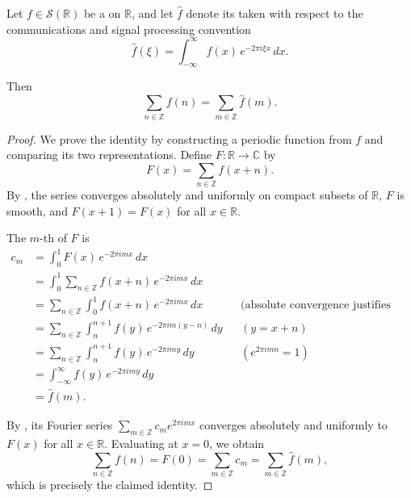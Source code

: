 \begin{theorem}
\label{theorem:poisson_summation_formula_for_schwartz_functions_on_real_numbers}
Let $f \in \mathcal{S}(\mathbb{R})$ be a  on $\mathbb{R}$, and let $\hat{f}$ denote its  taken with respect to the communications and signal processing convention
$$\hat{f}(\xi) = \int_{-\infty}^{\infty} f(x) \, e^{-2\pi i \xi x} \, dx.$$

Then
$$\sum_{n \in \mathbb{Z}} f(n) = \sum_{m \in \mathbb{Z}} \hat{f}(m).$$
\end{theorem}

\begin{proof}
We prove the identity by constructing a periodic function from $f$ and comparing its two representations.
Define $F : \mathbb{R} \to \mathbb{C}$ by
$$F(x) = \sum_{n \in \mathbb{Z}} f(x + n).$$
By , the series converges absolutely and uniformly on compact subsets of $\mathbb{R}$, $F$ is smooth, and $F(x+1) = F(x)$ for all $x \in \mathbb{R}$.

The $m$-th  of $F$ is
\begin{align*}
c_m &= \int_0^1 F(x) \, e^{-2\pi i m x} \, dx \\
    &= \int_0^1 \sum_{n \in \mathbb{Z}} f(x + n) \, e^{-2\pi i m x} \, dx \\
    &= \sum_{n \in \mathbb{Z}} \int_0^1 f(x + n) \, e^{-2\pi i m x} \, dx &&\text{(absolute convergence justifies interchange)} \\
    &= \sum_{n \in \mathbb{Z}} \int_n^{n+1} f(y) \, e^{-2\pi i m (y - n)} \, dy &&(y = x + n) \\
    &= \sum_{n \in \mathbb{Z}} \int_n^{n+1} f(y) \, e^{-2\pi i m y} \, dy &&(e^{2\pi i m n} = 1) \\
    &= \int_{-\infty}^{\infty} f(y) \, e^{-2\pi i m y} \, dy \\
    &= \hat{f}(m). 
\end{align*}

By , its Fourier series $\sum_{m\in\mathbb{Z}} c_m e^{2\pi i m x}$ converges absolutely and uniformly to $F(x)$ for all $x \in \mathbb{R}$. Evaluating at $x = 0$, we obtain
$$\sum_{n \in \mathbb{Z}} f(n) = F(0) = \sum_{m \in \mathbb{Z}} c_m = \sum_{m \in \mathbb{Z}} \hat{f}(m),$$
which is precisely the claimed identity.
\end{proof}